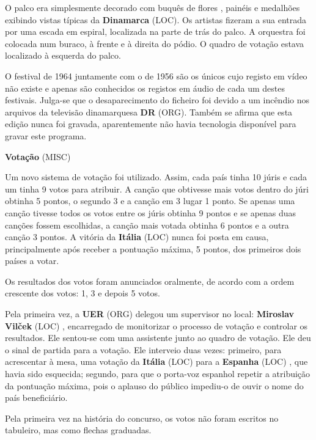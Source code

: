 \documentclass[12pt,a4paper]{article}
\begin{document}
O palco era simplesmente decorado com buquês de flores , painéis e medalhões exibindo vistas típicas da \textbf{Dinamarca} (LOC). Os artistas fizeram a sua entrada por uma escada em espiral, localizada na parte de trás do palco. A orquestra foi colocada num buraco, à frente e à direita do pódio. O quadro de votação estava localizado à esquerda do palco.

O festival de 1964 juntamente com o de 1956 são os únicos cujo registo em vídeo não existe e apenas são conhecidos os registos em áudio de cada um destes festivais. Julga-se que o desaparecimento do ficheiro foi devido a um incêndio nos arquivos da televisão dinamarquesa \textbf{DR} (ORG). Também se afirma que esta edição nunca foi gravada, aparentemente não havia tecnologia disponível para gravar este programa.



\textbf{Votação} (MISC)

Um novo sistema de votação foi utilizado. Assim, cada país tinha 10 júris e cada um tinha 9 votos para atribuir. A canção que obtivesse mais votos dentro do júri obtinha 5 pontos, o segundo 3 e a canção em 3 lugar 1 ponto. Se apenas uma canção tivesse todos os votos entre os júris obtinha 9 pontos e se apenas duas canções fossem escolhidas, a canção mais votada obtinha 6 pontos e a outra canção 3 pontos. A vitória da \textbf{Itália} (LOC) nunca foi posta em causa, principalmente após receber a pontuação máxima, 5 pontos, dos primeiros dois países a votar.

Os resultados dos votos foram anunciados oralmente, de acordo com a ordem crescente dos votos: 1, 3 e depois 5 votos.

Pela primeira vez, a \textbf{UER} (ORG) delegou um supervisor no local: \textbf{Miroslav Vilček} (LOC) , encarregado de monitorizar o processo de votação e controlar os resultados. Ele sentou-se com uma assistente junto ao quadro de votação. Ele deu o sinal de partida para a votação. Ele interveio duas vezes: primeiro, para acrescentar à mesa, uma votação da \textbf{Itália} (LOC) para a \textbf{Espanha} (LOC) , que havia sido esquecida; segundo, para que o porta-voz espanhol repetir a atribuição da pontuação máxima, pois o aplauso do público impediu-o de ouvir o nome do país beneficiário.

Pela primeira vez na história do concurso, os votos não foram escritos no tabuleiro, mas como flechas graduadas.
\end{document}
